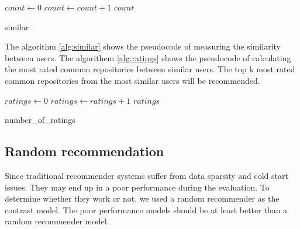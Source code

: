 \documentclass[11pt,twoside]{report}
\begin{document}
\begin{algorithm}[H]
    \DontPrintSemicolon
    

    $count \leftarrow 0$ \newline
    {
        {
            $count \leftarrow count + 1$
        }
    }
    \Return $count$
    
    \caption{similar}
    \label{alg:similar}
\end{algorithm}

The algorithm \ref{alg:similar} shows the pseudocode of measuring the similarity between users. The algorithem \ref{alg:ratings} shows the pseudocode of calculating the most rated common repositories between similar users. The top k most rated common repositories from the most similar users will be recommended.

\begin{algorithm}[H]
    \DontPrintSemicolon
    

    $ratings \leftarrow 0$ \newline
    {
        {
            $ratings \leftarrow ratings + 1$
        }
    }
    \Return $ratings$
    
    \caption{number\_of\_ratings}
    \label{alg:ratings}
\end{algorithm}


\subsection{Random recommendation}
Since traditional recommender systems suffer from data sparsity and cold start issues. They may end up in a poor performance during the evaluation. To determine whether they work or not, we used a random recommender as the contrast model. The poor performance models should be at least better than a random recommender model.
\end{document}
